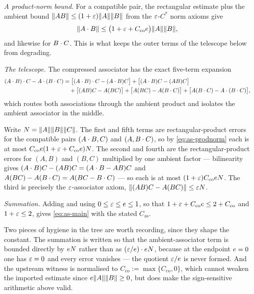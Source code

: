 \emph{A product-norm bound.} For a compatible pair, the rectangular estimate plus the
ambient bound $\lVert AB\rVert\le(1+\varepsilon)\lVert A\rVert\lVert B\rVert$ from the $\varepsilon$-$C^*$ norm axioms give
\begin{equation}\label{eq:as-prodnorm}
  \lVert A\mathbin{\cdot} B\rVert\le\bigl(1+\varepsilon+C_{\mathrm{co}}e\bigr)\lVert A\rVert\lVert B\rVert,
\end{equation}
and likewise for $B\mathbin{\cdot} C$. This is what keeps the outer terms of the telescope below from
degrading.

\emph{The telescope.} The compressed associator has the exact five-term expansion
\begin{align}\label{eq:as-telescope}
  (A\mathbin{\cdot} B)\mathbin{\cdot} C-A\mathbin{\cdot}(B\mathbin{\cdot} C)
  &=\bigl[(A\mathbin{\cdot} B)\mathbin{\cdot} C-(A\mathbin{\cdot} B)C\bigr]
   +\bigl[(A\mathbin{\cdot} B)C-(AB)C\bigr] \notag\\
  &\quad+\bigl[(AB)C-A(BC)\bigr]
   +\bigl[A(BC)-A(B\mathbin{\cdot} C)\bigr]
   +\bigl[A(B\mathbin{\cdot} C)-A\mathbin{\cdot}(B\mathbin{\cdot} C)\bigr],
\end{align}
which routes both associations through the ambient product and isolates the ambient
associator in the middle.

Write $N=\lVert A\rVert\lVert B\rVert\lVert C\rVert$. The first and fifth terms are rectangular-product errors
for the compatible pairs $(A\mathbin{\cdot} B,C)$ and $(A,B\mathbin{\cdot} C)$, so by
\eqref{eq:as-prodnorm} each is at most
$C_{\mathrm{co}}e(1+\varepsilon+C_{\mathrm{co}}e)N$. The second and fourth are the
rectangular-product errors for $(A,B)$ and $(B,C)$ multiplied by one ambient factor ---
bilinearity gives $(A\mathbin{\cdot} B)C-(AB)C=(A\mathbin{\cdot} B-AB)C$ and
$A(BC)-A(B\mathbin{\cdot} C)=A(BC-B\mathbin{\cdot} C)$ --- so each is at most
$(1+\varepsilon)C_{\mathrm{co}}e N$. The third is precisely the $\varepsilon$-associator axiom,
$\lVert (AB)C-A(BC)\rVert\le\varepsilon N$.

\emph{Summation.} Adding and using $0\le\varepsilon\le e\le1$, so that
$1+\varepsilon+C_{\mathrm{co}}e\le2+C_{\mathrm{co}}$ and $1+\varepsilon\le2$, gives
\eqref{eq:as-main} with the stated $C_{\mathrm{as}}$.

Two pieces of hygiene in the tree are worth recording, since they shape the constant. The
summation is written so that the ambient-associator term is bounded directly by $e N$
rather than as $(\varepsilon/e)\cdot e N$, because at the endpoint $e=0$ one has
$\varepsilon=0$ and every error vanishes --- the quotient $\varepsilon/e$ is never formed. And the
upstream witness is normalised to $C_{\mathrm{co}}:=\max\{C_{\mathrm{co}},0\}$, which
cannot weaken the imported estimate since $e\lVert A\rVert\lVert B\rVert\ge0$, but does make the
sign-sensitive arithmetic above valid.

